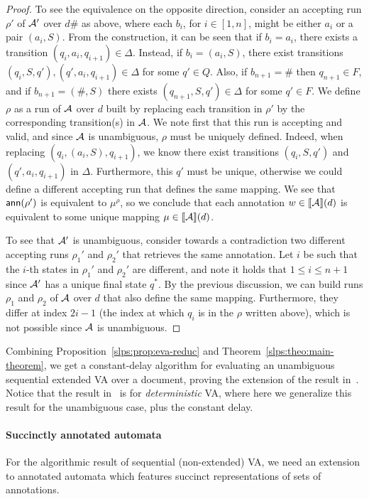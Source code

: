 \begin{proof}
	To see the equivalence on the opposite direction, consider an accepting run $\rho'$ of $\mathcal{A}'$ over $d\texttt{\#}$ as above, where each $b_i$, for $i\in[1, n]$, might be either $a_i$ or a pair $(a_i, S)$. 
	From the construction, it can be seen that if $b_i = a_i$, there exists a transition $(q_{i},a_i, q_{i+1})\in\Delta$. Instead, if $b_i = (a_i, S)$, there exist transitions $(q_{i},S, q'),(q',a_i,q_{i+1})\in\Delta$ for some $q'\in Q$. 
	Also, if $b_{n+1} = \texttt{\#}$ then $q_{n+1}\in F$, and if $b_{n+1} = (\texttt{\#}, S)$ there exists $(q_{n+1},S,q')\in\Delta$ for some $q'\in F$. We define $\rho$ as a run of $\mathcal{A}$ over $d$ built by replacing each transition in $\rho'$ by the corresponding transition(s) in $\mathcal{A}$. We note first that this run is accepting and valid, and since $\mathcal{A}$ is unambiguous, $\rho$ must be uniquely defined. 
	Indeed, when replacing $(q_{i}, (a_i, S), q_{i+1})$, we know there exist transitions $(q_{i}, S, q')$ and $(q', a_i, q_{i+1})$ in $\Delta$. 
	Furthermore, this $q'$ must be unique, otherwise we could define a different accepting run that defines the same mapping. 
	We see that $\textsf{ann}(\rho')$ is equivalent to $\mu^\rho$, so we conclude that each annotation $w\in{\llbracket{\mathcal{A}}\rrbracket}(d)$ is equivalent to some unique mapping $\mu\in{\llbracket{\mathcal{A}}\rrbracket}(d)$.
	
	To see that $\mathcal{A}'$ is unambiguous, consider towards a contradiction two different accepting runs $\rho_1'$ and $\rho_2'$ that retrieves the same annotation. Let $i$ be such that the $i$-th states in $\rho_1'$ and $\rho_2'$ are different, and note it holds that $1\leq i \leq n+1$ since $\mathcal{A}'$ has a unique final state $q^*$. 
	By the previous discussion, we can build runs $\rho_1$ and $\rho_2$ of $\mathcal{A}$ over $d$ that also define the same mapping. Furthermore, they differ at index $2i-1$ (the index at which $q_i$ is in the $\rho$ written above), which is not possible since $\mathcal{A}$ is unambiguous.
	\qedhere
\end{proof}

Combining Proposition~\ref{slps:prop:eva-reduc} and Theorem~\ref{slps:theo:main-theorem}, we get a constant-delay algorithm for evaluating an unambiguous sequential extended VA over a document, proving the extension of the result in~\cite{SchmidS21}. Notice that the result in~\cite{SchmidS21} is for \emph{deterministic} VA, where here we generalize this result for the unambiguous case, plus the constant delay. 



\paragraph{Succinctly annotated automata}
For the algorithmic result of sequential (non-extended) VA, we need an extension to annotated automata which features succinct representations of sets of annotations. 

